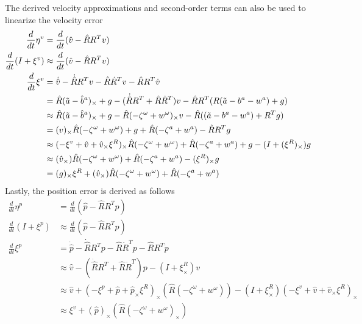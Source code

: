 The derived velocity approximations and second-order terms can also be used to linearize the velocity error
\begin{equation}
    \begin{split}
        \frac{d}{dt} \eta^v &= \frac{d}{dt} (\hat{v} - \hat{R} R^T v) \\
        \frac{d}{dt} (I + \xi^v) &\approx \frac{d}{dt} (\hat{v} - \hat{R} R^T v) \\
        \frac{d}{dt} \xi^v &= \dot{\hat{v}} - \dot{\hat{R}}R^Tv - \hat{R} \dot{R}^T v - \hat{R} R^T \dot{v}\\
        &= \hat{R} (\Tilde{a} - \hat{b}^a)_{\times} + g -
            (\dot{\hat{R}}R^T + \hat{R} \dot{R}^T)v -
            \hat{R} R^T (R (\Tilde{a} - b^a - w^a) + g) \\
        &\approx \hat{R} (\Tilde{a} - \hat{b}^a)_{\times} + g -
            \hat{R} (-\zeta^{\omega} + w^{\omega})_{\times} v -
            \hat{R}((\Tilde{a} - b^a - w^a) + R^T g) \\
        &= (v)_{\times} \hat{R} (-\zeta^{\omega} + w^{\omega}) + g +
            \hat{R} (-\zeta^{a} + w^{a}) -
            \hat{R} R^T g \\
        &\approx  (-\xi^v + \hat{v} + \hat{v}_{\times} \xi^R)_{\times} \hat{R} (-\zeta^{\omega} + w^{\omega}) +
            \hat{R} (-\zeta^{a} + w^{a}) + g -
            (I + (\xi^R)_{\times})g \\
        &\approx (\hat{v}_{\times}) \hat{R} (-\zeta^{\omega} + w^{\omega}) +
            \hat{R} (-\zeta^{a} + w^{a}) -
            (\xi^R)_{\times} g \\
        &= (g)_{\times} \xi^R + 
            (\hat{v}_{\times}) \hat{R} (-\zeta^{\omega} + w^{\omega}) +
              \hat{R} (-\zeta^{a} + w^{a})
        \label{eq: v linearized RInEKF}
    \end{split}
\end{equation}
Lastly, the position error is derived as follows
\begin{equation}
    \begin{split}
        \frac{d}{dt} \eta^p &= \frac{d}{dt} (\hat{p} - \hat{R} R^T p) \\
        \frac{d}{dt} (I + \xi^p) &\approx \frac{d}{dt} (\hat{p} - \hat{R} R^T p) \\
        \frac{d}{dt} \xi^p &= \dot{\hat{p}} - \dot{\hat{R}}R^Tp - \hat{R} \dot{R}^T p - \hat{R} R^T \dot{p}\\
        &\approx \hat{v} - (\dot{\hat{R}}R^T + \hat{R} \dot{R}^T)p - (I +\xi^R_{\times})v\\
        &\approx \hat{v} + (-\xi^p + \hat{p} + \hat{p}_{\times} \xi^R)_{\times} (\hat{R} (-\zeta^{\omega} + w^{\omega}))  - (I +\xi^R_{\times}) (-\xi^v + \hat{v} + \hat{v}_{\times} \xi^R)_{\times}\\
        &\approx \xi^v + (\hat{p})_{\times} (\hat{R} (-\zeta^{\omega} + w^{\omega})_{\times})
    \end{split}
    \label{eq: p linearized RInEKF}
\end{equation}

